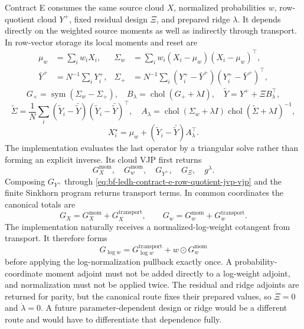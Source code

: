 Contract E consumes the same source cloud \(X\), normalized probabilities
\(w\), row-quotient cloud \(Y^+\), fixed residual design \(\Xi\), and prepared
ridge \(\lambda\).  It depends directly on the weighted source moments as well
as indirectly through transport.  In row-vector storage its local moments and
reset are
\begin{align}
  \mu_w&=\sum_iw_iX_i,&
  \Sigma_w&=\sum_iw_i(X_i-\mu_w)(X_i-\mu_w)^\top,\\
  \bar Y^+&=N^{-1}\sum_iY_i^+,&
  \Sigma_+&=N^{-1}\sum_i(Y_i^+-\bar Y^+)(Y_i^+-\bar Y^+)^\top,
\end{align}
\begin{equation}
\label{eq:bf-ledh-contract-e-affine-reset}
  G_+=\operatorname{sym}(\Sigma_w-\Sigma_+),\quad
  B_\lambda=\operatorname{chol}(G_++\lambda I),\quad
  \widetilde Y=Y^++\Xi B_\lambda^\top,
\end{equation}
\begin{equation}
  \widetilde\Sigma=\frac1N\sum_i
    (\widetilde Y_i-\bar{\widetilde Y})
    (\widetilde Y_i-\bar{\widetilde Y})^\top,\quad
  A_\lambda=
    \operatorname{chol}(\Sigma_w+\lambda I)
    \operatorname{chol}(\widetilde\Sigma+\lambda I)^{-1},
\end{equation}
\begin{equation}
  X_i^\star=\mu_w+
    (\widetilde Y_i-\bar{\widetilde Y})A_\lambda^\top.
\end{equation}
The implementation evaluates the last operator by a triangular solve rather
than forming an explicit inverse.  Its cloud VJP first returns
\[
  G_X^{\mathrm{mom}},\quad G_w^{\mathrm{mom}},\quad G_{Y^+},
  \quad G_\Xi,\quad g^\lambda .
\]
Composing \(G_{Y^+}\) through
\eqref{eq:bf-ledh-contract-e-row-quotient-jvp-vjp} and the finite Sinkhorn
program returns transport terms.  In common coordinates the canonical totals
are
\begin{equation}
\label{eq:bf-ledh-contract-e-total-source-pullback}
  G_X=G_X^{\mathrm{mom}}+G_X^{\mathrm{transport}},\qquad
  G_w=G_w^{\mathrm{mom}}+G_w^{\mathrm{transport}} .
\end{equation}
The implementation naturally receives a normalized-log-weight cotangent from
transport.  It therefore forms
\begin{equation}
\label{eq:bf-ledh-contract-e-total-logweight-pullback}
  G_{\log w}
  =G_{\log w}^{\mathrm{transport}}+w\odot G_w^{\mathrm{mom}}
\end{equation}
before applying the log-normalization pullback exactly once.  A
probability-coordinate moment adjoint must not be added directly to a log-weight
adjoint, and normalization must not be applied twice.  The residual and ridge
adjoints are returned for parity, but the canonical route fixes their prepared
values, so \(\dot\Xi=0\) and \(\dot\lambda=0\).  A future
parameter-dependent design or ridge would be a different route and would have
to differentiate that dependence fully.

